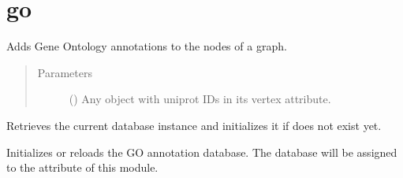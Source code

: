 \documentclass[letterpaper,10pt,english]{sphinxmanual}
\begin{document}
\section{go}
\label{\detokenize{reference:module-pypath.go}}\label{\detokenize{reference:go}}

\begin{fulllineitems}
\label{\detokenize{reference:pypath.go.annotate}}
Adds Gene Ontology annotations to the nodes of a graph.
\begin{quote}\begin{description}
\item[{Parameters}] \leavevmode
{} () \textendash{} Any  object with uniprot IDs
in its  vertex attribute.

\end{description}\end{quote}

\end{fulllineitems}


\begin{fulllineitems}
\label{\detokenize{reference:pypath.go.get_db}}
Retrieves the current database instance and initializes it if does
not exist yet.

\end{fulllineitems}


\begin{fulllineitems}
\label{\detokenize{reference:pypath.go.init_db}}
Initializes or reloads the GO annotation database.
The database will be assigned to the  attribute of this module.

\end{fulllineitems}
\end{document}
